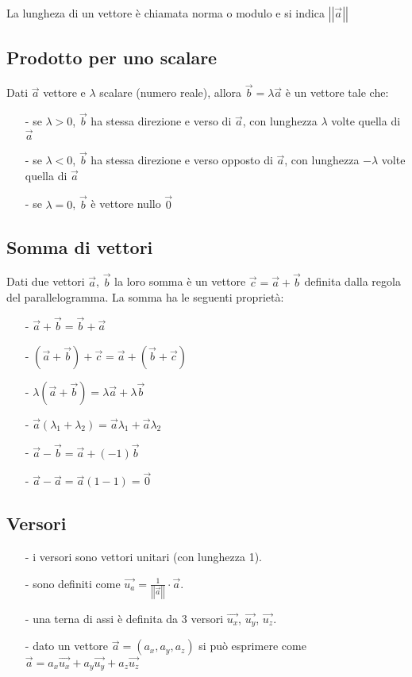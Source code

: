 \documentclass[a4paper]{article}
\begin{document}
La lungheza di un vettore è chiamata norma o modulo e si indica \(\left|\left| \vec{a} \right|\right|\)

\subsection{Prodotto per uno scalare}
Dati \(\vec{a}\) vettore e \(\lambda\) scalare (numero reale), allora \(\vec{b} = \lambda \vec{a}\) è un vettore tale che:
\begin{itemize}[topsep=3pt, itemsep=0pt]
	\item[-] se \(\lambda > 0\), \(\vec{b}\) ha stessa direzione e verso di \(\vec{a}\), con lunghezza \(\lambda\) volte quella di \(\vec{a}\)
	\item[-] se \(\lambda < 0\), \(\vec{b}\) ha stessa direzione e verso opposto di \(\vec{a}\), con lunghezza \(-\lambda\) volte quella di \(\vec{a}\)
	\item[-] se \(\lambda = 0\), \(\vec{b}\) è vettore nullo \(\vec{0}\)
\end{itemize}

\subsection{Somma di vettori}
Dati due vettori \(\vec{a}\), \(\vec{b}\) la loro somma è un vettore \(\vec{c} = \vec{a} + \vec{b}\) definita dalla regola del
parallelogramma. La somma ha le seguenti proprietà:
\begin{itemize}[topsep=3pt, itemsep=0pt]
	\item[-] \(\vec{a} + \vec{b} = \vec{b} + \vec{a}\)
	\item[-] \((\vec{a} + \vec{b}) + \vec{c} = \vec{a} + (\vec{b} + \vec{c})\)
	\item[-] \(\lambda (\vec{a} + \vec{b}) = \lambda \vec{a} + \lambda \vec{b}\)
	\item[-] \(\vec{a} (\lambda_1 + \lambda_2) = \vec{a} \lambda_1 + \vec{a} \lambda_2\)
	\item[-] \(\vec{a} - \vec{b} = \vec{a} + (-1)\vec{b}\)
	\item[-] \(\vec{a} - \vec{a} = \vec{a}(1-1) = \vec{0}\)
\end{itemize}	


\subsection{Versori}
\begin{itemize}[topsep=3pt, itemsep=0pt]
	\item[-] i versori sono vettori unitari (con lunghezza 1).
	\item[-] sono definiti come \(\vec{u_a} = \frac{1}{\left|\left|\vec{a}\right|\right|} \cdot \vec{a}\).
	\item[-] una terna di assi è definita da 3 versori \(\vec{u_x}\), \(\vec{u_y}\), \(\vec{u_z}\).
	\item[-] dato un vettore \(\vec{a} = \left(a_x, a_y, a_z\right)\) si può esprimere come \(\vec{a} = a_x \vec{u_x} + a_y \vec{u_y} + a_z \vec{u_z}\)
\end{itemize}
\end{document}
